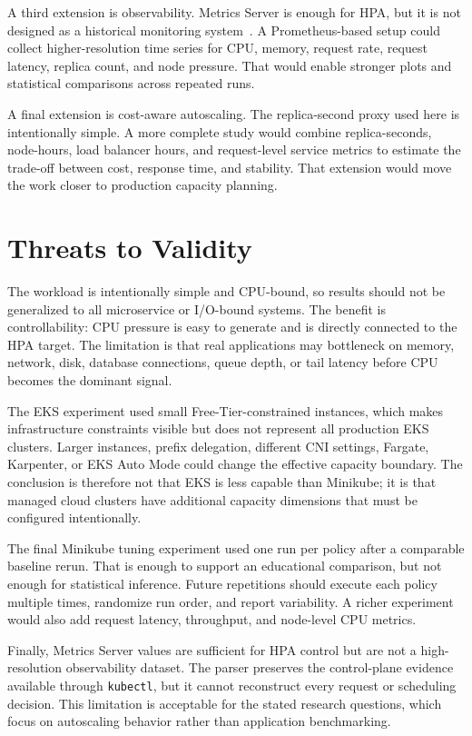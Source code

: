 \documentclass[conference]{IEEEtran}
\begin{document}
A third extension is observability. Metrics Server is enough for HPA, but it is not designed as a historical monitoring system~\cite{kubernetes_metrics_server}. A Prometheus-based setup could collect higher-resolution time series for CPU, memory, request rate, request latency, replica count, and node pressure. That would enable stronger plots and statistical comparisons across repeated runs.

A final extension is cost-aware autoscaling. The replica-second proxy used here is intentionally simple. A more complete study would combine replica-seconds, node-hours, load balancer hours, and request-level service metrics to estimate the trade-off between cost, response time, and stability. That extension would move the work closer to production capacity planning.

\section{Threats to Validity}

The workload is intentionally simple and CPU-bound, so results should not be generalized to all microservice or I/O-bound systems. The benefit is controllability: CPU pressure is easy to generate and is directly connected to the HPA target. The limitation is that real applications may bottleneck on memory, network, disk, database connections, queue depth, or tail latency before CPU becomes the dominant signal.

The EKS experiment used small Free-Tier-constrained instances, which makes infrastructure constraints visible but does not represent all production EKS clusters. Larger instances, prefix delegation, different CNI settings, Fargate, Karpenter, or EKS Auto Mode could change the effective capacity boundary. The conclusion is therefore not that EKS is less capable than Minikube; it is that managed cloud clusters have additional capacity dimensions that must be configured intentionally.

The final Minikube tuning experiment used one run per policy after a comparable baseline rerun. That is enough to support an educational comparison, but not enough for statistical inference. Future repetitions should execute each policy multiple times, randomize run order, and report variability. A richer experiment would also add request latency, throughput, and node-level CPU metrics.

Finally, Metrics Server values are sufficient for HPA control but are not a high-resolution observability dataset. The parser preserves the control-plane evidence available through \texttt{kubectl}, but it cannot reconstruct every request or scheduling decision. This limitation is acceptable for the stated research questions, which focus on autoscaling behavior rather than application benchmarking.
\end{document}
